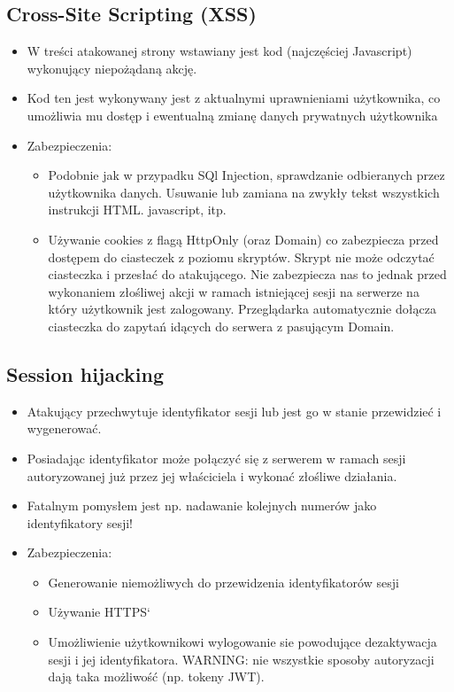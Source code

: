 \documentclass[../main.tex]{subfiles}
\begin{document}
    \subsection{Cross-Site Scripting (XSS)}
    \begin{itemize}
        \item W treści atakowanej strony wstawiany jest kod (najczęściej Javascript)
        wykonujący niepożądaną akcję.
        \item Kod ten jest wykonywany jest z aktualnymi uprawnieniami użytkownika, co
        umożliwia mu dostęp i ewentualną zmianę danych prywatnych użytkownika
        \item Zabezpieczenia:
        \begin{itemize}
            \item Podobnie jak w przypadku SQl Injection, sprawdzanie odbieranych przez
            użytkownika danych. Usuwanie lub zamiana na zwykły tekst wszystkich
            instrukcji HTML. javascript, itp.
            \item Używanie cookies z flagą HttpOnly (oraz Domain) co zabezpiecza przed
            dostępem do ciasteczek z poziomu skryptów. Skrypt nie może odczytać
            ciasteczka i przesłać do atakującego.
            Nie zabezpiecza nas to jednak przed wykonaniem złośliwej akcji w
            ramach istniejącej sesji na serwerze na który użytkownik jest zalogowany.
            Przeglądarka automatycznie dołącza ciasteczka do zapytań idących do
            serwera z pasującym Domain.
        \end{itemize}
    \end{itemize}

    \subsection{Session hijacking}
    \begin{itemize}
        \item Atakujący przechwytuje identyfikator sesji lub jest go w stanie przewidzieć i
        wygenerować.
        \item Posiadając identyfikator może połączyć się z serwerem w ramach sesji
        autoryzowanej już przez jej właściciela i wykonać złośliwe działania.
        \item Fatalnym pomysłem jest np. nadawanie kolejnych
        numerów jako identyfikatory sesji!
        \item Zabezpieczenia:
        \begin{itemize}
            \item Generowanie niemożliwych do przewidzenia identyfikatorów sesji
            \item Używanie HTTPS`
            \item Umożliwienie użytkownikowi wylogowanie sie powodujące dezaktywacja sesji
            i jej identyfikatora. WARNING: nie wszystkie sposoby autoryzacji dają taka
            możliwość (np. tokeny JWT).
        \end{itemize}
    \end{itemize}
\end{document}
